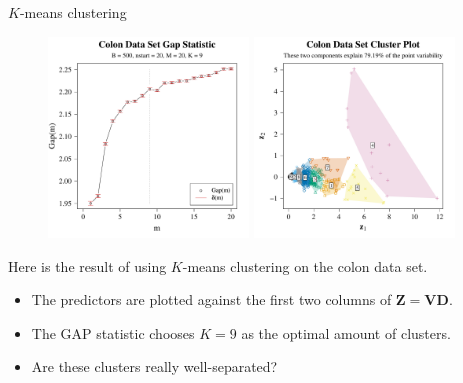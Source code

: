 \documentclass[8pt]{beamer}
\begin{document}
\begin{frame}{$K$-means clustering}

\begin{figure}
    \centering
    \includegraphics[width = 0.475\textwidth]{colon_gap_stat.pdf}
    \includegraphics[width = 0.475\textwidth]{colon_clus_plot.pdf}
\end{figure}

Here is the result of using $K$-means clustering on the colon data set.
\begin{itemize}
    \item The predictors are plotted against the first two columns of $\mathbf{Z} = \mathbf{V} \mathbf{D}$.
    \item The GAP statistic chooses $K=9$ as the optimal amount of clusters.
    \item Are these clusters really well-separated? %
\end{itemize}
    
\end{frame}
\end{document}

